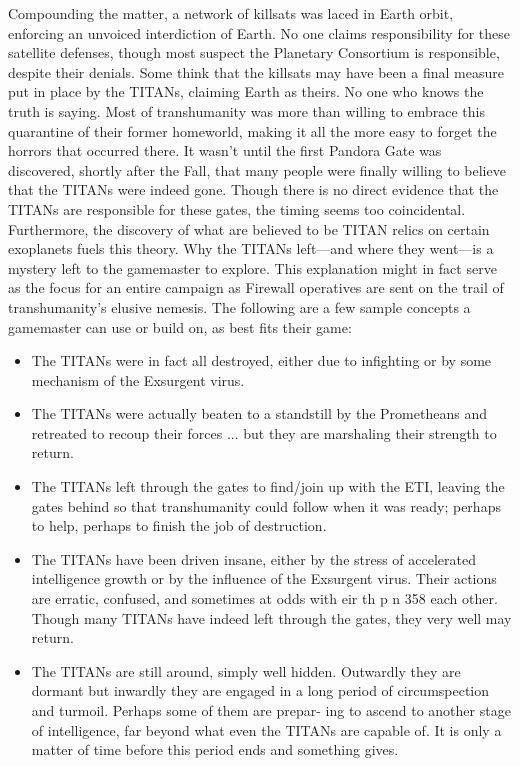 Compounding the matter, a network of killsats was laced in Earth orbit, enforcing an unvoiced interdiction of Earth. No one claims responsibility for these satellite defenses, though most suspect the Planetary Consortium is responsible, despite their denials. Some think that the killsats may have been a final measure put in place by the TITANs, claiming Earth as theirs. No one who knows the truth is saying. Most of transhumanity was more than willing to embrace this quarantine of their former homeworld, making it all the more easy to forget the horrors that occurred there. It wasn't until the first Pandora Gate was discovered, shortly after the Fall, that many people were finally willing to believe that the TITANs were indeed gone. Though there is no direct evidence that the TITANs are responsible for these gates, the timing seems too coincidental. Furthermore, the discovery of what are believed to be TITAN relics on certain exoplanets fuels this theory. Why the TITANs left—and where they went—is a mystery left to the gamemaster to explore. This explanation might in fact serve as the focus for an entire campaign as Firewall operatives are sent on the trail of transhumanity's elusive nemesis. The following are a few sample concepts a gamemaster can use or build on, as best fits their game: 

\begin{itemize} \item The TITANs were in fact all destroyed, either due to infighting or by some mechanism of the Exsurgent virus. \item The TITANs were actually beaten to a standstill by the Prometheans and retreated to recoup their forces ... but they are marshaling their strength to return. \item The TITANs left through the gates to find/join up with the ETI, leaving the gates behind so that transhumanity could follow when it was ready; perhaps to help, perhaps to finish the job of destruction. \item The TITANs have been driven insane, either by the stress of accelerated intelligence growth or by the influence of the Exsurgent virus. Their actions are erratic, confused, and sometimes at odds with eir th p n 358 each other. Though many TITANs have indeed left through the gates, they very well may return. \item The TITANs are still around, simply well hidden. Outwardly they are dormant but inwardly they are engaged in a long period of circumspection and turmoil. Perhaps some of them are prepar- ing to ascend to another stage of intelligence, far beyond what even the TITANs are capable of. It is only a matter of time before this period ends and something gives. \end{itemize} 

